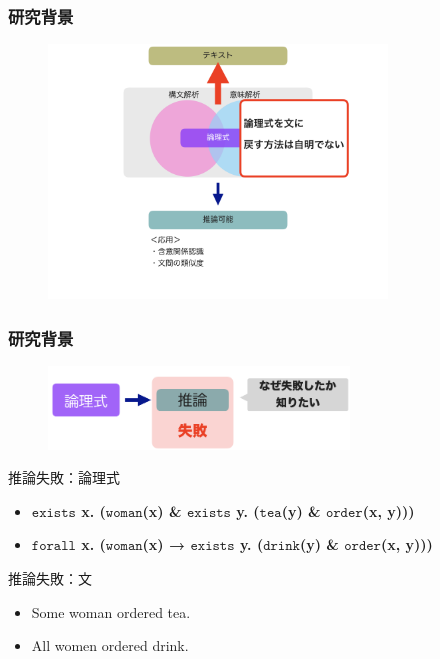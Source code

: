 \documentclass[dvipdfmx]{beamer}
\newcommand{\LF}[1]{\ensuremath{\texttt{#1}}}
\begin{document}
\begin{frame}
\frametitle{研究背景}
\begin{flushright}
\begin{figure}[h]
	\includegraphics[width=9cm]{backend2.png}
        \label{fig:backend2}
\end{figure}
\end{flushright}
\end{frame}

\begin{frame}
\frametitle{研究背景}
\begin{center}
\begin{figure}[h]
	\includegraphics[width=8cm]{backend4.png}
        \label{fig:backend4}
\end{figure}
\end{center}
\begin{block}{推論失敗：論理式}
  \begin{itemize}
    \fontsize{9pt}{0pt}\selectfont
    \item \textbf{\LF{exists} x. (\LF{woman}(x) \& \LF{exists} y. (\LF{tea}(y) \& \LF{order}(x, y)))}
    \item \textbf{\LF{forall} x. (\LF{woman}(x) → \LF{exists} y. (\LF{drink}(y) \& \LF{order}(x, y)))}
    \fontsize{12pt}{0pt}\selectfont
  \end{itemize}
\end{block}
\begin{block}{推論失敗：文}
  \begin{itemize}
    \item Some woman ordered tea.
    \item All women ordered drink.
  \end{itemize}
\end{block}

\end{frame}
\end{document}
